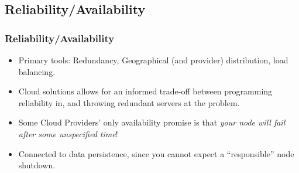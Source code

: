 \documentclass[10pt]{beamer}
\def\subitem{\item[\hspace{1.5cm} -]}
\begin{document}


\subsection{Reliability/Availability}
\begin{frame}[t]
\frametitle{Reliability/Availability}
\begin{itemize}
\item Primary tools: Redundancy, Geographical (and provider) distribution, load balancing.
\item Cloud solutions allows for an informed trade-off between programming reliability in, and throwing redundant servers at the problem.
\item Some Cloud Providers' only availability promise is that \emph{your node will fail after some unspecified time}!
\item Connected to data persistence, since you cannot expect a ``responsible'' node shutdown.
\end{itemize}
\end{frame}
\end{document}
